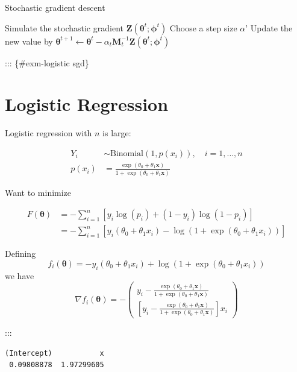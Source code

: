 \documentclass[
  letterpaper,
  DIV=11,
  numbers=noendperiod]{scrreprt}
\theoremstyle{definition}
\theoremstyle{definition}
\theoremstyle{remark}
\begin{document}
\begin{algorithm}[htb!]
\caption{Stochastic gradient descent}
\label{alg-sgd}
\begin{algorithmic}[1]
    \State Simulate the stochastic gradient $\pmb{Z}(\pmb{\theta}^t; \pmb{\phi}^t)$
    \State Choose a step size $\alpha$'
    \State Update the new value by $\pmb{\theta}^{t+1} \leftarrow \pmb{\theta}^{t}  - \alpha_t \pmb{M}_t^{-1}\pmb{Z} (\pmb{\theta}^t; \pmb{\phi}^t)$
  \EndFor
\EndProcedure
\end{algorithmic}
\end{algorithm}

::: \{\#exm-logistic sgd\}

\section{Logistic Regression}\label{logistic-regression}

Logistic regression with \(n\) is large:

\begin{align*}
Y_i &\sim \text{Binomial}(1, p(x_i)), \quad{} i=1, \ldots, n\\
p(x_i) &= \frac{\exp (\theta_0 + \theta_1 \pmb{x})}{1+\exp (\theta_0 + \theta_1 \pmb{x})}
\end{align*}

Want to minimize

\begin{align*}
F(\pmb{\theta}) &= -\sum_{i=1}^n [y_i \log (p_i) + (1-y_i) \log (1-p_i)]\\
&= -\sum_{i=1}^n [y_i (\theta_0 + \theta_1 x_i)- \log (1 + \exp (\theta_0 + \theta_1 x_i))]
\end{align*}

Defining \[
f_i (\pmb{\theta}) = -y_i (\theta_0 + \theta_1 x_i) + \log (1+\exp (\theta_0 + \theta_1 x_i))
\] we have \[
\nabla f_i (\pmb{\theta}) = -
\begin{pmatrix}
y_i - \frac{\exp (\theta_0 + \theta_1 \pmb{x})}{1+\exp (\theta_0 + \theta_1 \pmb{x})}\\
[y_i - \frac{\exp (\theta_0 + \theta_1 \pmb{x})}{1+\exp (\theta_0 + \theta_1 \pmb{x})}]x_i
\end{pmatrix}
\]

:::

\begin{verbatim}
(Intercept)           x 
 0.09808878  1.97299605 
\end{verbatim}
\end{document}
